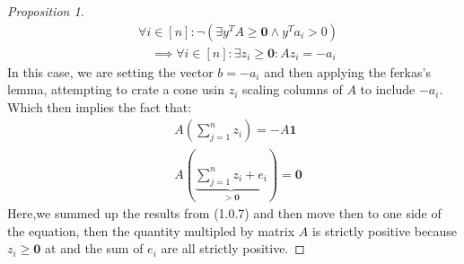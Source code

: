 \documentclass[]{article}
\theoremstyle{definition}
\begin{document}
\begin{proof}[Proposition 1]
        \begin{align}
            & \forall i \in [n]: \neg(\exists y^TA \ge \mathbf 0 \wedge y^Ta_i > 0)
            \\ 
            &\quad \implies 
            \forall i \in [n]: \exists z_i \ge \mathbf 0: Az_i = -a_i
        \end{align}
       In this case, we are setting the vector $b = -a_i$ and then applying the ferkas's lemma, attempting to crate a cone usin $z_i$ scaling columns of $A$ to include $-a_i$. Which then implies the fact that: 
       \begin{align}
            & A\left(
                \sum_{j = 1}^{n}z_i
            \right) = -A\mathbf 1
            \\
            & 
            A\left(
                \underbrace{\sum_{j = 1}^{n}z_i + e_i}_{> \mathbf 0}
            \right) = \mathbf 0
       \end{align}
       Here,we summed up the results from (1.0.7) and then move then to one side of the equation, then the quantity multipled by matrix $A$ is strictly positive because $z_i\ge \mathbf 0$ at and the sum of $e_i$ are all strictly positive. 
    

    \end{proof}
\end{document}

